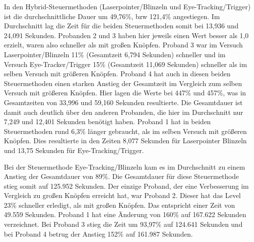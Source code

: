 In den Hybrid-Steuermethoden (Laserpointer/Blinzeln und Eye-Tracking/Trigger) ist die durchschnittliche Dauer um 49,76\%, bzw 121,4\% angestiegen. Im Durchschnitt lag die Zeit für die beiden Steuermethoden somit bei 13,936  und 24,091 Sekunden. Probanden 2 und 3 haben hier jeweils einen Wert besser als 1,0 erzielt, waren also schneller als mit großen Knöpfen. Proband 3 war im Versuch Laserpointer/Blinzeln 11\% (Gesamtzeit 6,794 Sekunden) schneller und im Versuch Eye-Tracker/Trigger 15\% (Gesamtzeit 11,069 Sekunden) schneller als im selben Versuch mit größeren Knöpfen. Proband 4 hat auch in diesen beiden Steuermethoden einen starken Anstieg der Gesamtzeit im Vergleich zum selben Versuch mit größeren Knöpfen. Hier lagen die Werte bei 447\% und 457\%, was in Gesamtzeiten von 33,996 und 59,160 Sekunden resultierte. Die Gesamtdauer ist damit auch deutlich über den anderen Probanden, die hier im Durchschnitt nur 7,249 und 12,401 Sekunden benötigt haben. Proband 1 hat in beiden Steuermethoden rund 6,3\% länger gebraucht, als im selben Versuch mit größeren Knöpfen. Dies resultierte in den Zeiten 8,077 Sekunden für Laserpointer Blinzeln und 13,75 Sekunden für Eye-Tracking/Trigger.


Bei der Steuermethode Eye-Tracking/Blinzeln kam es im Durchschnitt zu einem Anstieg der Gesamtdauer von 89\%. Die Gesamtdauer für diese Steuermethode stieg somit auf 125.952 Sekunden. Der einzige Proband, der eine Verbesserung im Vergleich zu großen Knöpfen erreicht hat, war Proband 2. Dieser hat das Level 23\% schneller erledigt, als mit großen Knöpfen. Das entspricht einer Zeit von 49.559 Sekunden. Proband 1 hat eine Änderung von 160\% auf 167.622 Sekunden verzeichnet. Bei Proband 3 stieg die Zeit um 93,97\% auf 124.641 Sekunden und bei Proband 4 betrug der Anstieg 152\% auf 161.987 Sekunden. 

